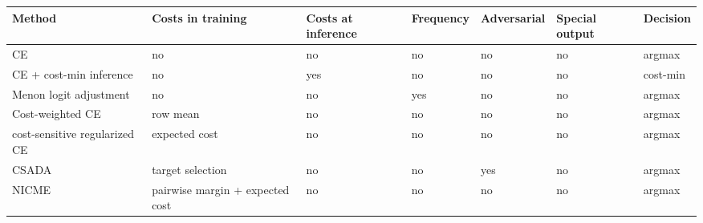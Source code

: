 \begin{tabular}{lllllll}
\toprule
Method & Costs in training & Costs at inference & Frequency & Adversarial & Special output & Decision \\
\midrule
CE & no & no & no & no & no & argmax \\
CE + cost-min inference & no & yes & no & no & no & cost-min \\
Menon logit adjustment & no & no & yes & no & no & argmax \\
Cost-weighted CE & row mean & no & no & no & no & argmax \\
cost-sensitive regularized CE & expected cost & no & no & no & no & argmax \\
CSADA & target selection & no & no & yes & no & argmax \\
NICME & pairwise margin + expected cost & no & no & no & no & argmax \\
\bottomrule
\end{tabular}
